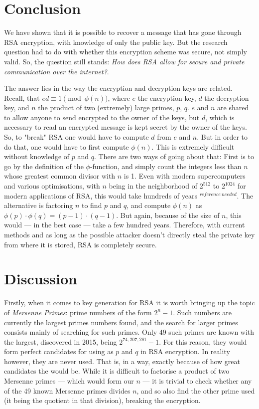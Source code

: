 \documentclass[12pt, titlepage]{article}
\let\oldsection\section
\renewcommand\section{\clearpage\oldsection}
\begin{document}
\section{Conclusion}

We have shown that it is possible to recover a message that has gone through RSA encryption,
with knowledge of only the public key. But the research question had to do with whether this
encryption scheme was secure, not simply valid. So, the question still stands: \emph{How
does RSA allow for secure and private communication over the internet?}. 

The answer lies in the way the encryption and decryption keys are related. Recall, that
$ed\equiv 1 \pmod{\phi(n)}$, where $e$ the encryption key, $d$ the decryption key, and $n$
the product of two (extremely) large primes, $p$, $q$. $e$ and $n$ are shared to allow
anyone to send encrypted to the owner of the keys, but $d$, which is necessary to read an
encrypted message is kept secret by the owner of the keys. So, to "break" RSA one would have
to compute $d$ from $e$ and $n$. But in order to do that, one would have to first compute
$\phi(n)$. This is extremely difficult without knowledge of $p$ and $q$. There are two ways
of going about that: First is to go by the definition of the $\phi$-function, and simply
count the integers less than $n$ whose greatest common divisor with $n$ is 1. Even with
modern supercomputers and various optimisations, with $n$ being in the neighborhood of
$2^{512}$ to $2^{1024}$ for modern applications of RSA, this would take hundreds of years
$^{reference\ needed}$.  The alternative is factoring $n$ to find $p$ and $q$, and compute
$\phi(n)$ as $\phi(p) \cdot \phi(q) = (p-1) \cdot (q-1)$. But again, because of the size of
$n$, this would --- in the best case --- take a few hundred years. Therefore, with current
methods and as long as the possible attacker doesn't directly steal the private key from
where it is stored, RSA is completely secure.

\section{Discussion}

Firstly, when it comes to key generation for RSA it is worth bringing up the topic of
\emph{Mersenne Primes}: prime numbers of the form $2^n - 1$. Such numbers are currently the
largest primes numbers found, and the search for larger primes consists mainly of searching
for such primes. Only 49 such primes are known with the largest, discovered in 2015, being
$2^{74,207,281} - 1$.\autocite{newscientist_mersenne} For this reason, they would form
perfect candidates for using as $p$ and $q$ in RSA encryption. In reality however, they are
never used. That is, in a way, exactly because of how great candidates the would be. While
it is difficult to factorise a product of two Mersenne primes --- which would form our $n$
--- it is trivial to check whether any of the 49 known Mersenne primes divides $n$, and so
also find the other prime used (it being the quotient in that division), breaking the
encryption.



\printbibliography
\end{document}

